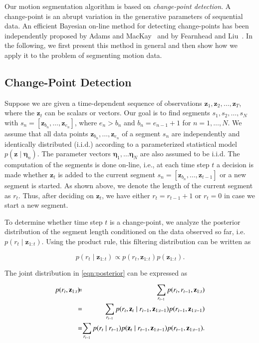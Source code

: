 Our motion segmentation algorithm is based on \emph{change-point detection}. A
change-point is an abrupt variation in the generative parameters of sequential
data. An efficient Bayesian on-line method for detecting change-points has been
independently proposed by Adams and MacKay~\cite{adams07bayesian} and by
Fearnhead and Liu~\cite{fearnhead07online}. In the following, we first present
this method in general and then show how we apply it to the problem of
segmenting motion data.

\subsection{Change-Point Detection}
Suppose we are given a time-dependent sequence of observations $\mathbf{z}_1,
\mathbf{z}_2, \dots,\mathbf{z}_T$, where the $\mathbf{z}_t$ can be scalars or
vectors. Our goal is to find segments $s_1,s_2,\dots,s_N$ with
$s_n=[\mathbf{z}_{b_n},\dots,\mathbf{z}_{e_n}]$, where $e_n > b_n$ and
$b_n = e_{n-1}+1$ for $n=1,\dots,N$. We assume that all data points
$\mathbf{z}_{b_n},\dots,\mathbf{z}_{e_n}$ of a segment $s_n$ are independently
and identically distributed (i.i.d.) according to a parameterized statistical
model \mbox{$p(\mathbf{z}\mid \boldsymbol{\eta}_n)$}. The parameter vectors
$\boldsymbol{\eta}_1,\dots \boldsymbol{\eta}_N$ are also assumed to be i.i.d.
The computation of the segments is done on-line, i.e., at each time step $t$ a
decision is made whether $\mathbf{z}_t$ is added to the current segment
$s_n=[\mathbf{z}_{b_n},\dots,\mathbf{z}_{t-1}]$ or a new segment is started. As
shown above, we denote the length of the current segment as $r_t$. Thus, after
deciding on $\mathbf{z}_t$, we have either $r_t=r_{t-1}+1$ or $r_t=0$ in case we
start a new segment.

To determine whether time step $t$ is a change-point, we analyze the posterior
distribution of the segment length conditioned on the data observed so far,
i.e. $p(r_t\mid \mathbf{z}_{1:t})$. Using the product rule, this filtering
distribution can be written as

\begin{equation}
\label{eqn:posterior}
p(r_t\mid \mathbf{z}_{1:t})\propto p(r_t,\mathbf{z}_{1:t})p(\mathbf{z}_{1:t}).
\end{equation}

The joint distribution in \eqref{eqn:posterior} can be expressed as

\begin{eqnarray}
\label{eqn:joint}
p(r_t,\mathbf{z}_{1:t})\hspace{-0.2cm}&=& \hspace{-0.35cm}\sum_{r_{t-1}}p(r_t,
r_{t-1},\mathbf{z}_{1:t})\nonumber\\
&=&\hspace{-0.35cm}\sum_{r_{t-1}}p(r_t,\mathbf{z}_t\mid r_{t-1},
\mathbf{z}_{1:t-1})p(r_{t-1},\mathbf{z}_{1:t-1})\nonumber\\
&=&\hspace{-0.35cm}\sum_{r_{t-1}}p(r_t\mid r_{t-1})p(\mathbf{z}_t\mid r_{t-1},
\mathbf{z}_{1:t-1})p(r_{t-1},\mathbf{z}_{1:t-1}).
\end{eqnarray}

